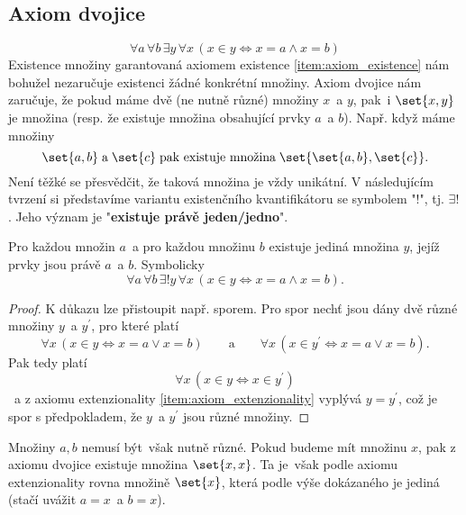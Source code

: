 \subsection{Axiom dvojice}
\begin{equation*}
    \forall a\,\forall b\,\exists y\,\forall x\,(x \in y \iff x=a \land x=b)
\end{equation*}
Existence množiny garantovaná axiomem existence \ref{item:axiom_existence} nám bohužel nezaručuje existenci žádné konkrétní množiny. Axiom dvojice nám zaručuje, že pokud máme dvě (ne nutně různé) množiny $x$~a $y$, pak~i $\set{x,y}$ je množina (resp. že existuje množina obsahující prvky $a$~a $b$). Např. když máme množiny
\begin{equation*}
    \set{a,b}\;\text{a}\;\set{c}\;\text{pak existuje množina}\;\set{\set{a,b},\set{c}}.
\end{equation*}
Není těžké se přesvědčit, že taková množina je vždy unikátní. V následujícím tvrzení si představíme variantu existenčního kvantifikátoru se symbolem "$!$", tj. $\exists!$. Jeho význam je "\textbf{existuje právě jeden/jedno}".
\begin{lemma}\label{lem:univerzalnost_neusp_dvojic}
    Pro každou množin $a$~a pro každou množinu $b$ existuje jediná množina $y$, jejíž prvky jsou právě $a$~a $b$. Symbolicky
    \begin{equation*}
        \forall a\,\forall b\,\exists!y\,\forall x\,(x \in y \iff x=a \land x=b).
    \end{equation*}
\end{lemma}
\begin{proof}
    K důkazu lze přistoupit např. sporem. Pro spor nechť jsou dány dvě různé množiny $y$~a $y^\prime$, pro které platí
    \begin{equation*}
        \forall x\,(x\in y \iff x=a \lor x=b)\qquad \text{a}\qquad\forall x\, (x\in y^\prime \iff x=a \lor x=b).
    \end{equation*}
    Pak tedy platí
    \begin{equation*}
        \forall x\,(x\in y \iff x\in y^\prime)
    \end{equation*}
   ~a z axiomu extenzionality \ref{item:axiom_extenzionality} vyplývá $y=y^\prime$, což je spor s předpokladem, že $y$~a $y^\prime$ jsou různé množiny.
\end{proof}
Množiny $a,b$ nemusí být~však nutně různé. Pokud budeme mít množinu $x$, pak z axiomu dvojice existuje množina $\set{x,x}$. Ta je~však podle axiomu extenzionality rovna množině $\set{x}$, která podle výše dokázaného je jediná (stačí uvážit $a=x$~a $b=x$).
